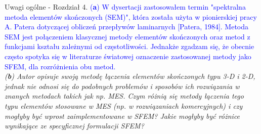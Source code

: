 \documentclass[10pt,aspectratio=169]{beamer} %
\begin{document}
\begin{frame}[label=frame8]{Uwagi ogólne - Rozdział 4.}\justifying
\textcolor{blue}{(\textbf{a}) W dysertacji zastosowałem termin "spektralna metoda elementów skończonych (SEM)", która została użyta w pionierskiej pracy A. Patera dotyczącej obliczeń przepływów laminarnych [Patera, 1984]. Metoda SEM jest połączeniem klasycznej metody elementów skończonych oraz metod z funkcjami kształu zależnymi od częstotliwości. Jednakże zgadzam się, że obecnie często spotyka się w literaturze światowej oznaczenie zastosowanej metody jako SFEM, dla rozróżnienia obu metod.}\\
\textit{(\textbf{b}) Autor opisuje swoją metodę łączenia elementów skończonych typu 3-D i 2-D, jednak nie odnosi się do podobnych problemów i sposobów ich rozwiązania w znanych metodach takich jak np. MES. Czym różnią się metody łączenia tego typu elementów stosowane w MES (np. w rozwiązaniach komercyjnych) i czy mogłyby być wprost zaimplementowane w SFEM? Jakie mogłyby być różnice wynikające ze specyficznej formulacji SFEM?}
\end{frame}
\end{document}

